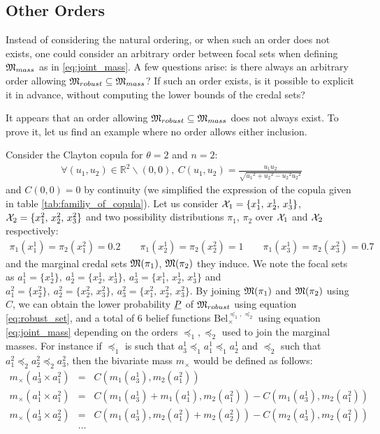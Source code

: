 \subsection{Other Orders}
Instead of considering the natural ordering, or when such an order does not exists, one could consider an arbitrary order between focal sets when defining ${\mathfrak{M}}_{mass}$ as in \eqref{eq:joint_mass}. A few questions arise: is there always an arbitrary order allowing ${\mathfrak{M}}_{robust}\subseteq{\mathfrak{M}}_{mass}$? If such an order exists, is it possible to explicit it in advance, \ie without computing the lower bounds of the credal sets?

It appears that an order allowing ${\mathfrak{M}}_{robust}\subseteq{\mathfrak{M}}_{mass}$ does not always exist. To prove it, let us find an example where no order allows either inclusion.

\begin{example}
Consider the Clayton copula for $\theta=2$ and $n=2$:
\begin{eqnarray*}
    \forall (u_1,u_2)\in\mathbb{R}^2\backslash(0,0), ~C(u_1,u_2)=\frac{u_1u_2}{\sqrt{{u_1}^2+{u_2}^2-{u_2}^2{u_2}^2}}
\end{eqnarray*}
and $C(0,0)=0$ by continuity (we simplified the expression of the copula given in table \ref{tab:familiy_of_copula}). Let us consider ${\mathcal{X}}_1=\{x^1_1,\, x^1_2,\, x^1_3\}$, ${\mathcal{X}}_2=\{x^2_1,\, x^2_2,\, x^2_3\}$ and two possibility distributions $\pi_1$, $\pi_2$ over ${\mathcal{X}}_1$ and ${\mathcal{X}}_2$ respectively:
\begin{eqnarray*}
    \pi_1(x^1_1)=\pi_2(x^2_1)=0.2 \qquad \pi_1(x^1_2)=\pi_2(x^2_2)=1 \qquad \pi_1(x^1_3)=\pi_2(x^2_3)=0.7 
\end{eqnarray*}
and the marginal credal sets ${\mathfrak{M}}(\pi_1)$, ${\mathfrak{M}}(\pi_2)$ they induce. We note the focal sets as $a^1_1=\{x^1_2\},~a^1_2=\{x^1_2,\, x^1_3\},~a^1_3=\{x^1_1,\,x^1_2,\,x^1_3\}$ and $a^2_1=\{x^2_2\},~a^2_2=\{x^2_2,\, x^2_3\},~a^2_3=\{x^2_1,\, x^2_2,\, x^2_3\}$. By joining ${\mathfrak{M}}(\pi_1)$ and ${\mathfrak{M}}(\pi_2)$ using $C$, we can obtain the lower probability ${\underline{P}}$ of ${\mathfrak{M}}_{robust}$ using equation \eqref{eq:robust_set}, and a total of 6 belief functions $\mathrm{Bel}^{\preceq_1,\preceq_2}_\times$ using equation \eqref{eq:joint_mass} depending on the orders $\preceq_1, \preceq_2$ used to join the marginal masses. For instance if $\preceq_1$ is such that $a^1_3\preceq_1 a^1_1 \preceq_1 a^1_2$ and $\preceq_2$ such that $a^2_1 \preceq_2 a^2_2 \preceq_2 a^2_3$, then the bivariate mass $m_\times$ would be defined as follows:
\begin{eqnarray*}
    m_\times(a^1_3\times a^2_1) &=& C(m_1(a^1_3), m_2(a^2_1))\\
    m_\times(a^1_1\times a^2_1) &=& C(m_1(a^1_3)+m_1(a^1_1), m_2(a^2_1)) - C(m_1(a^1_3), m_2(a^2_1))\\
    m_\times(a^1_3\times a^2_2) &=& C(m_1(a^1_3), m_2(a^2_1) + m_2(a^2_2)) - C(m_2(a^1_3), m_2(a^2_1))\\
    &\dots&
\end{eqnarray*}


\end{example}
